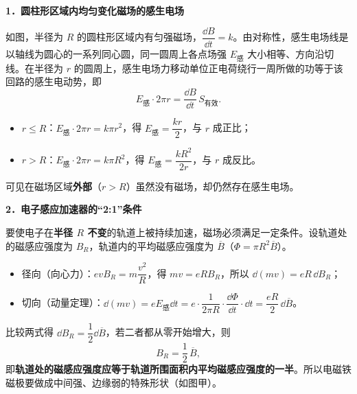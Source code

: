 \begin{tuozhan}
\textbf{1．圆柱形区域内均匀变化磁场的感生电场}

如图，半径为 $R$ 的圆柱形区域内有匀强磁场，$\dfrac{\dd B}{\dd t}=k$。由对称性，感生电场线是以轴线为圆心的一系列同心圆，同一圆周上各点场强 $E_{\text{感}}$ 大小相等、方向沿切线。在半径为 $r$ 的圆周上，感生电场力移动单位正电荷绕行一周所做的功等于该回路的感生电动势，即
\[
E_{\text{感}}\cdot 2\pi r = \frac{\dd B}{\dd t}\,S_{\text{有效}} .
\]

\noindent\begin{minipage}[c]{0.6\linewidth}
\begin{itemize}[leftmargin=1.2em,label=\textbullet]
  \item $r\le R$：$E_{\text{感}}\cdot 2\pi r=k\pi r^2$，得 $E_{\text{感}}=\dfrac{kr}{2}$，与 $r$ 成正比；
  \item $r> R$：$E_{\text{感}}\cdot 2\pi r=k\pi R^2$，得 $E_{\text{感}}=\dfrac{kR^2}{2r}$，与 $r$ 成反比。
\end{itemize}
可见在磁场区域\textbf{外部}（$r>R$）虽然没有磁场，却仍然存在感生电场。
\end{minipage}\hfill
\noindent\begin{minipage}[c]{0.36\linewidth}
\centering
{}
\end{minipage}

\medskip
\textbf{2．电子感应加速器的“2:1”条件}

要使电子在\textbf{半径 $R$ 不变}的轨道上被持续加速，磁场必须满足一定条件。设轨道处的磁感应强度为 $B_R$，轨道内的平均磁感应强度为 $\overline{B}$（$\Phi=\pi R^2\overline{B}$）。
\begin{itemize}[leftmargin=2.4em,label=\textbullet]
  \item 径向（向心力）：$evB_R=m\dfrac{v^2}{R}$，得 $mv=eRB_R$，所以 $\dd(mv)=eR\,\dd B_R$；
  \item 切向（动量定理）：$\dd(mv)=eE_{\text{感}}\dd t=e\cdot\dfrac{1}{2\pi R}\cdot\dfrac{\dd \Phi}{\dd t}\cdot\dd t=\dfrac{eR}{2}\,\dd\overline{B}$。
\end{itemize}
比较两式得 $\dd B_R=\dfrac12\dd\overline{B}$，若二者都从零开始增大，则
\[
B_R=\frac12\,\overline{B},
\]
即\textbf{轨道处的磁感应强度应等于轨道所围面积内平均磁感应强度的一半}。所以电磁铁磁极要做成中间强、边缘弱的特殊形状（如图甲）。
\end{tuozhan}
